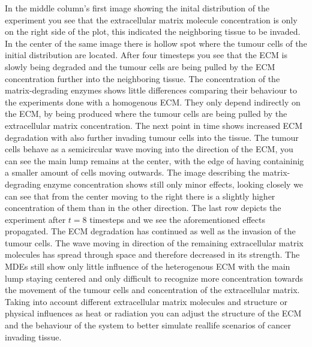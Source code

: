 In the middle column's first image showing the inital distribution of the experiment you see that the extracellular matrix molecule concentration is only on the right side of the plot, this indicated the neighboring tissue to be invaded. In the center of the same image there is hollow spot where the tumour cells of the initial distribution are located. \newline 
After four timesteps you see that the ECM is slowly being degraded and the tumour cells are being pulled by the ECM concentration further into the neighboring tissue. The concentration of the matrix-degrading enzymes shows little differences comparing their behaviour to the experiments done with a homogenous ECM. They only depend indirectly on the ECM, by being produced where the tumour cells are being pulled by the extracellular matrix concentration. \newline
The next point in time shows increased ECM degradation with also further invading tumour cells into the tissue. The tumour cells behave as a semicircular wave moving into the direction of the ECM, you can see the main lump remains at the center, with the edge of having containinig a smaller amount of cells moving outwards. The image describing the matrix-degrading enzyme concentration shows still only minor effects, looking closely we can see that from the center moving to the right there is a slightly higher concentration of them than in the other direction.\newline
The last row depicts the experiment after $t=8$ timesteps and we see the aforementioned effects propagated. The ECM degradation has continued as well as the invasion of the tumour cells. The wave moving in direction of the remaining extracellular matrix molecules has spread through space and therefore decreased in its strength. The MDEs still show only little influence of the heterogenous ECM with the main lump staying centered and only difficult to recognize more concentration towards the movement of the tumour cells and concentration of the extracellular matrix.\newline 
Taking into account different extracellular matrix molecules and structure or physical influences as heat or radiation you can adjust the structure of the ECM and the behaviour of the system to better simulate reallife scenarios of cancer invading tissue.